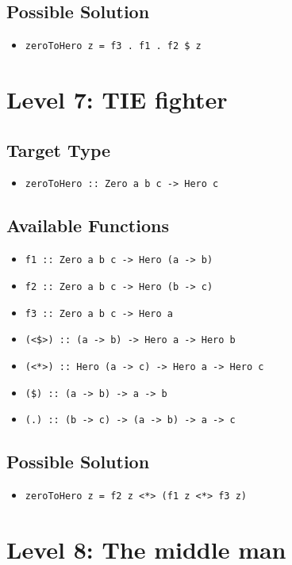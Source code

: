 \subsection{Possible Solution} 
\begin{itemize}
    \item \texttt{zeroToHero z = f3 . f1 . f2 \$ z}
\end{itemize}

\section{Level 7: TIE fighter}
\subsection{Target Type } 
\begin{itemize}
    \item \texttt{zeroToHero :: Zero a b c -> Hero c}
\end{itemize}

\subsection{Available Functions} 
\begin{itemize}
    \item \texttt{f1 :: Zero a b c -> Hero (a -> b)}
    \item \texttt{f2 :: Zero a b c -> Hero (b -> c)}
    \item \texttt{f3 :: Zero a b c -> Hero a}
    \item \texttt{(<\$>) :: (a -> b) -> Hero a -> Hero b}
    \item \texttt{(<*>) :: Hero (a -> c) -> Hero a -> Hero c}
    \item \texttt{(\$) :: (a -> b) -> a -> b}
    \item \texttt{(.) :: (b -> c) -> (a -> b) -> a -> c}
\end{itemize}

\subsection{Possible Solution} 
\begin{itemize}
    \item \texttt{zeroToHero z = f2 z <*> (f1 z <*> f3 z)}
\end{itemize}

\section{Level 8: The middle man}
